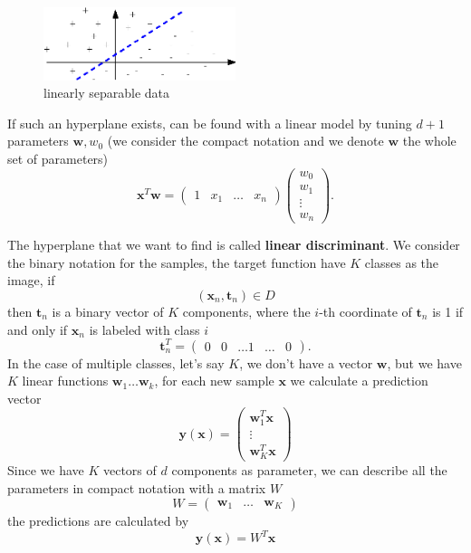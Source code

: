 \documentclass[10pt, letterpaper]{report}
\begin{document}
\begin{figure}[h!]
	\centering
	\includegraphics[width=0.5\textwidth]{images/linsep.eps}
	\caption{linearly separable data}
	\label{img:linsep}
\end{figure}

If such an hyperplane exists, can be found with a linear model by tuning $d+1$ parameters $\mathbf w, w_0$ (we consider the compact notation and we denote $\mathbf w$ the whole set of parameters) $$ \mathbf x^T\mathbf w=\begin{pmatrix}
		1 & x_1 & \dots & x_n
	\end{pmatrix}\begin{pmatrix}
		w_0 \\w_1 \\\vdots \\ w_n
	\end{pmatrix}.$$

The hyperplane that we want to find is called \textbf{linear discriminant}.
We consider the binary notation for the samples, the target function have $K$ classes as the image, if
$$ (\mathbf x_n,\mathbf t_n)\in D$$
then $\mathbf t_n$ is a binary vector of $K$ components, where the $i$-th coordinate of  $\mathbf t_n$ is 1 if and only if $\mathbf x_n$ is labeled with class $i$
$$
	\mathbf t^T_n=\begin{pmatrix}
		0 & 0 & \dots 1 & \dots & 0
	\end{pmatrix}
	.
$$
In the case of multiple classes, let's say $K$, we don't have a vector $\mathbf w$, but we have $K$ linear functions $\mathbf w_1\dots \mathbf w_k$, for each new sample $\mathbf x$ we calculate a prediction vector\begin{equation}
	\mathbf y(\mathbf x)=\begin{pmatrix}
		\mathbf w_1^T\mathbf x \\ \vdots \\ \mathbf w_K^T\mathbf x
	\end{pmatrix}
\end{equation}
Since we have $K$ vectors of $d$ components as parameter, we can describe all the parameters in compact notation with a matrix $W$\begin{equation}
	W=\begin{pmatrix}
		\mathbf w_1 & \dots & \mathbf w_K
	\end{pmatrix}
\end{equation}
the predictions are calculated by\begin{equation}
	\mathbf y(\mathbf x)=W^T\mathbf x
\end{equation}
\end{document}
